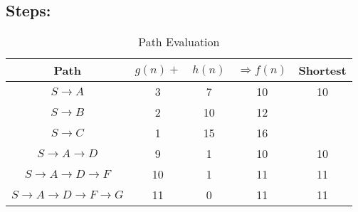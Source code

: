\documentclass{article}
\begin{document}
\pagebreak
\subsection*{Steps:}

\begin{table}[!h]
    \caption*{Path Evaluation}
    \begin{tabular}{|c|c|c|c|c|}
        \hline\hline
        Path & $g(n) +$ & $h(n)$ & $\Rightarrow f(n)$ & Shortest \\
        \hline\hline
        $S \rightarrow A$ & 3 & 7 & 10 & 10\\
        \hline
        $S \rightarrow B$ & 2 & 10 & 12 & \\
        \hline
        $S \rightarrow C$ & 1 & 15 & 16 & \\
        \hline
        $S \rightarrow A \rightarrow D$ & 9 & 1 & 10 & 10\\
        \hline
        $S \rightarrow A \rightarrow D \rightarrow F$ & 10 & 1 & 11 & 11\\
        \hline
        $S \rightarrow A \rightarrow D \rightarrow F \rightarrow G$ & 11 & 0 & 11 & 11\\
        \hline
    \end{tabular}
\end{table}
\end{document}
